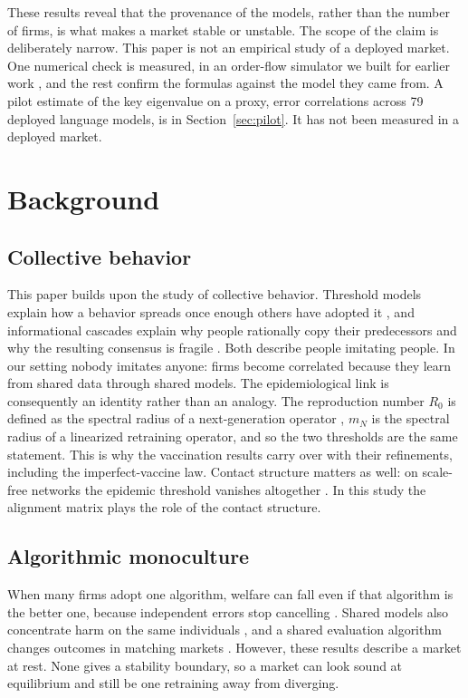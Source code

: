 \documentclass[conference]{IEEEtran}
\theoremstyle{definition}
\begin{document}
These results reveal that the provenance of the models, rather than the number
of firms, is what makes a market stable or unstable. The scope of the claim is
deliberately narrow. This paper is not an empirical study of a deployed
market. One numerical check is measured, in an order-flow simulator we built
for earlier work \cite{reflex2026}, and the rest confirm the formulas against
the model they came from. A pilot estimate of the key eigenvalue on a proxy,
error correlations across 79 deployed language models, is in
Section~\ref{sec:pilot}. It has not been measured in a deployed market.

\section{Background}

\subsection{Collective behavior}
This paper builds upon the study of collective behavior. Threshold models
explain how a behavior spreads once enough others have adopted it
\cite{granovetter1978}, and informational cascades explain why people
rationally copy their predecessors and why the resulting consensus is fragile
\cite{bikhchandani1992}. Both describe people imitating people. In our setting
nobody imitates anyone: firms become correlated because they learn from shared
data through shared models. The epidemiological link is consequently an
identity rather than an analogy. The reproduction number $R_0$ is defined as
the spectral radius of a next-generation operator \cite{diekmann1990}, $m_N$
is the spectral radius of a linearized retraining operator, and so the two
thresholds are the same statement. This is why the vaccination results carry
over with their refinements, including the imperfect-vaccine law. Contact
structure matters as well: on scale-free networks the epidemic threshold
vanishes altogether \cite{pastor2001}. In this study the alignment matrix
plays the role of the contact structure.

\subsection{Algorithmic monoculture}
When many firms adopt one algorithm, welfare can fall even if that algorithm
is the better one, because independent errors stop cancelling
\cite{kleinberg2021}. Shared models also concentrate harm on the same
individuals \cite{bommasani2022}, and a shared evaluation algorithm changes
outcomes in matching markets \cite{peng2024}. However, these results describe
a market at rest. None gives a stability boundary, so a market can look sound
at equilibrium and still be one retraining away from diverging.
\end{document}
